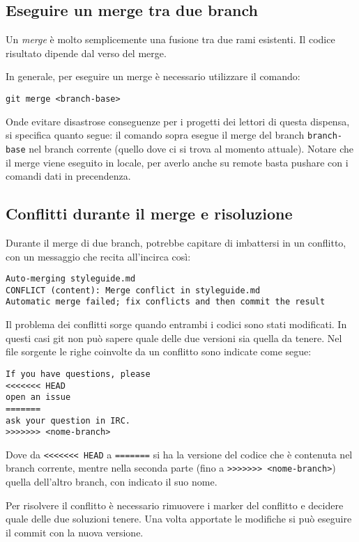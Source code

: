 \documentclass[a4paper, 11pt]{article}
\begin{document}
	\subsection{Eseguire un merge tra due branch}
	Un \emph{merge} è molto semplicemente una fusione tra due rami esistenti. Il codice risultato dipende dal verso del merge.
	
	In generale, per eseguire un merge è necessario utilizzare il comando: \begin{lstlisting}
git merge <branch-base>
	\end{lstlisting}
	Onde evitare disastrose conseguenze per i progetti dei lettori di questa dispensa, si specifica quanto segue: il comando sopra esegue il merge del branch \lstinline|branch-base| nel branch corrente (quello dove ci si trova al momento attuale). Notare che il merge viene eseguito in locale, per averlo anche su remote basta pushare con i comandi dati in precendenza.
	
	\subsection{Conflitti durante il merge e risoluzione}
	Durante il merge di due branch, potrebbe capitare di imbattersi in un conflitto, con un messaggio che recita all'incirca così:
	\begin{lstlisting}
Auto-merging styleguide.md
CONFLICT (content): Merge conflict in styleguide.md
Automatic merge failed; fix conflicts and then commit the result
	\end{lstlisting}
	
	Il problema dei conflitti sorge quando entrambi i codici sono stati modificati. In questi casi git non può sapere quale delle due versioni sia quella da tenere. Nel file sorgente le righe coinvolte da un conflitto sono indicate come segue:
	
	\begin{lstlisting}
If you have questions, please
<<<<<<< HEAD
open an issue
=======
ask your question in IRC.
>>>>>>> <nome-branch>
	\end{lstlisting}
	
	Dove da \lstinline|<<<<<<< HEAD| a \lstinline|=======| si ha la versione del codice che è contenuta nel branch corrente, mentre nella seconda parte (fino a \lstinline|>>>>>>> <nome-branch>|) quella dell'altro branch, con indicato il suo nome.
	
	Per risolvere il conflitto è necessario rimuovere i marker del conflitto e decidere quale delle due soluzioni tenere. Una volta apportate le modifiche si può eseguire il commit con la nuova versione.

	
	
	
	
	
	
	
	
\end{document}

